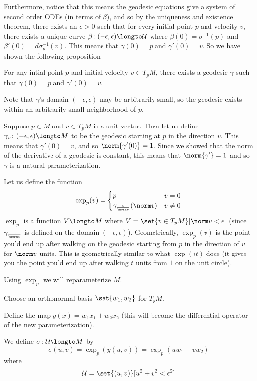 Furthermore, notice that this means the geodesic equations give a system of second order ODEs (in terms of $\beta$), and so by the uniqueness and existence theorem, there exists an $\epsilon>0$ such that for
every initial point $p$ and velocity $v$, there exists a unique curve $\beta\colon(-\epsilon,\epsilon)\longto\mU$ where $\beta(0)=\sigma^{-1}(p)$ and $\beta'(0)=d\sigma_p^{-1}(v)$.
This means that $\gamma(0)=p$ and $\gamma'(0)=v$.
So we have shown the following proposition

\begin{prop*}

    For any intial point $p$ and initial velocity $v\in T_pM$, there exists a geodesic $\gamma$ such that $\gamma(0)=p$ and $\gamma'(0)=v$.

\end{prop*}

Note that $\gamma$'s domain $(-\epsilon,\epsilon)$ may be arbitrarily small, so the geodesic exists within an arbitrarily small neighborhood of $p$.

Suppose $p\in M$ and $v\in T_pM$ is a unit vector.
Then let us define $\gamma_v\colon(-\epsilon,\epsilon)\longto M$ to be the geodesic starting at $p$ in the direction $v$.
This means that $\gamma'(0)=v$, and so $\norm{\gamma'(0)}=1$.
Since we showed that the norm of the derivative of a geodesic is constant, this means that $\norm{\gamma'}=1$ and so $\gamma$ is a natural parameterization.

Let us define the function
\[ \exp_p(v) = \begin{cases} p & v=0 \\ \gamma_{\frac v{\norm v}}(\norm v) & v\neq0 \end{cases} \]
$\exp_p$ is a function $V\longto M$ where $V=\set{v\in T_pM}[\norm v<\epsilon]$ (since $\gamma_{\frac v{\norm v}}$ is defined on the domain $(-\epsilon,\epsilon)$).
Geometrically, $\exp_p(v)$ is the point you'd end up after walking on the geodesic starting from $p$ in the direction of $v$ for $\norm v$ units.
This is geometrically similar to what $\exp(it)$ does (it gives you the point you'd end up after walking $t$ units from $1$ on the unit circle).

Using $\exp_p$ we will reparameterize $M$.
\benum
    \item Choose an orthonormal basis $\set{w_1,w_2}$ for $T_pM$.
    \item Define the map $y(x)=w_1x_1+w_2x_2$ (this will become the differential operator of the new parameterization).
    \item We define $\sigma\colon\mU\longto M$ by
    \[ \sigma(u,v) = \exp_p(y(u,v)) = \exp_p(uw_1+vw_2) \]
    where
    \[ \mU =\set{(u,v)}[u^2+v^2<\epsilon^2] \]
\eenum

